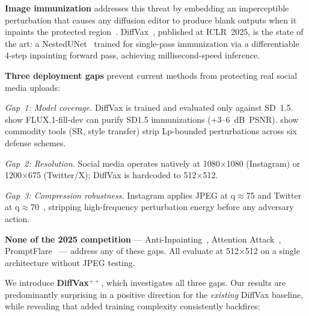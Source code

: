 \documentclass{article}
\newcommand{\diffvaxpp}{DiffVax$^{++}$\xspace}
\begin{document}
\textbf{Image immunization} addresses this threat by embedding an imperceptible
perturbation that causes any diffusion editor to produce blank outputs when it
inpaints the protected region~\citep{salman2023photoguard,shan2023glaze}.
DiffVax~\citep{ozdentarikcan2025diffvax}, published at ICLR~2025, is the state of the art:
a NestedUNet~\citep{zhou2018unetpp} trained for single-pass immunization via a
differentiable 4-step inpainting forward pass, achieving millisecond-speed inference.

\textbf{Three deployment gaps} prevent current methods from protecting real social media uploads:

\textit{Gap~1: Model coverage.} DiffVax is trained and evaluated only against SD~1.5.
\citet{zhao2026purify} show FLUX.1-fill-dev can purify SD1.5 immunizations (+3--6~dB~PSNR).
\citet{pleimling2026commodity} show commodity tools (SR, style transfer) strip
Lp-bounded perturbations across six defense schemes.

\textit{Gap~2: Resolution.} Social media operates natively at 1080$\times$1080
(Instagram) or 1200$\times$675 (Twitter/X); DiffVax is hardcoded to 512$\times$512.

\textit{Gap~3: Compression robustness.} Instagram applies JPEG at q$\approx$75 and
Twitter at q$\approx$70~\citep{instagram_compression}, stripping high-frequency
perturbation energy before any adversary action.

\textbf{None of the 2025 competition} --- Anti-Inpainting~\citep{guo2025antiinpaint},
Attention Attack~\citep{trippodo2025attn}, PromptFlare~\citep{na2025promptflare} ---
address any of these gaps. All evaluate at 512$\times$512 on a single architecture
without JPEG testing.

We introduce \textbf{\diffvaxpp}, which investigates all three gaps.
Our results are predominantly surprising in a positive direction for the
\emph{existing} DiffVax baseline, while revealing that added training complexity
consistently backfires:
\end{document}

